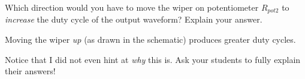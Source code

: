 

Which direction would you have to move the wiper on potentiometer $R_{pot2}$ to {\it increase} the duty cycle of the output waveform?  Explain your answer.







Moving the wiper {\it up} (as drawn in the schematic) produces greater duty cycles.







Notice that I did not even hint at {\it why} this is.  Ask your students to fully explain their answers!



